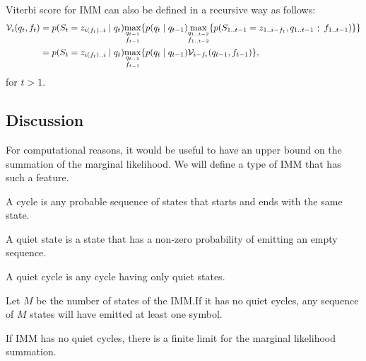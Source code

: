 Viterbi score for IMM can also be defined in a recursive way as follows:
\begin{equation*}
  \begin{split}
    \mathcal{V}_{i}(q_t,f_t)
    &= p(S_t=z_{i(f_t)..i} \;|\; q_t)
      \underset{\substack{q_{t-1}\\f_{t-1}}}{\max}
      \{
        p(q_t \;|\; q_{t-1})
        \underset{\substack{q_{1..t-2}\\f_{1..t-2}}}{\max}
        \{
          p(S_{1..t-1}=z_{1..i-f_t}, q_{1..t-1} ~;~ f_{1..t-1})
        \}
      \}\\
    &= p(S_t=z_{i(f_t)..i} \;|\; q_t)
      \underset{\substack{q_{t-1}\\f_{t-1}}}{\max}
      \{
        p(q_t \;|\; q_{t-1}) \mathcal{V}_{i-f_t}(q_{t-1},f_{t-1})
      \},
  \end{split}
\end{equation*}
for $t>1$.

\subsection{Discussion}

For computational reasons, it would be useful to have an upper bound on the summation of the
marginal likelihood.
We will define a type of IMM that has such a feature.

\begin{definition}
  A cycle is any probable sequence of states that starts and ends with the same state.
\end{definition}

\begin{definition}
  A quiet state is a state that has a non-zero probability of emitting an empty sequence.
\end{definition}

\begin{definition}
  A quiet cycle is any cycle having only quiet states.
\end{definition}

\begin{corollary}
  Let $M$ be the number of states of the IMM.\@ If it has no quiet cycles, any sequence of $M$ states
  will have emitted at least one symbol.
\end{corollary}

If IMM has no quiet cycles, there is a finite limit for the marginal likelihood summation.
